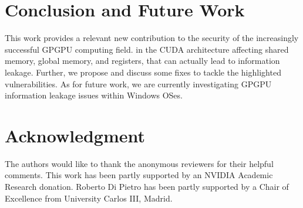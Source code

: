 \documentclass[11pt,onecolumn,letterpaper]{IEEEtran}
\begin{document}
\balance

\section{Conclusion and Future Work}
\label{conclusion}

This work provides a relevant new contribution to the security of the increasingly successful GPGPU computing field.
in the CUDA architecture affecting shared memory, global memory, and registers, that can actually lead to 
information leakage. 
Further, we propose and discuss some fixes 
to tackle the highlighted vulnerabilities. 
As for future work, we are currently investigating GPGPU information leakage issues within Windows OSes. 

\section*{Acknowledgment}
The authors would like to thank the anonymous reviewers for their helpful comments.
This work has been partly supported by an NVIDIA Academic Research donation.
Roberto Di Pietro has been partly supported by a Chair of Excellence from University Carlos
III, Madrid.\balance


\balance
\end{document}
